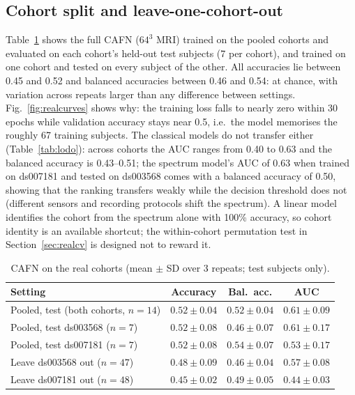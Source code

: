 \documentclass{ieeeaccessapprox}
\begin{document}
\subsection{Cohort split and leave-one-cohort-out}\label{sec:lodo}
Table~\ref{tab:cohortcafn} shows the full CAFN ($64^3$ MRI) trained on the pooled cohorts and evaluated on each cohort's held-out test subjects (7 per cohort), and trained on one cohort and tested on every subject of the other. All accuracies lie between 0.45 and 0.52 and balanced accuracies between 0.46 and 0.54: at chance, with variation across repeats larger than any difference between settings. Fig.~\ref{fig:realcurves} shows why: the training loss falls to nearly zero within 30 epochs while validation accuracy stays near 0.5, i.e.\ the model memorises the roughly 67 training subjects. The classical models do not transfer either (Table~\ref{tab:lodo}): across cohorts the AUC ranges from 0.40 to 0.63 and the balanced accuracy is 0.43--0.51; the spectrum model's AUC of 0.63 when trained on ds007181 and tested on ds003568 comes with a balanced accuracy of 0.50, showing that the ranking transfers weakly while the decision threshold does not (different sensors and recording protocols shift the spectrum). A linear model identifies the cohort from the spectrum alone with 100\% accuracy, so cohort identity is an available shortcut; the within-cohort permutation test in Section~\ref{sec:realcv} is designed not to reward it.

\begin{table}[!t]
\caption{CAFN on the real cohorts (mean $\pm$ SD over 3 repeats; test subjects only).}
\label{tab:cohortcafn}
\centering\scriptsize\setlength{\tabcolsep}{2.5pt}
\begin{tabular}{@{}lccc@{}}
\toprule
Setting & Accuracy & Bal.\ acc. & AUC\\
\midrule
Pooled, test (both cohorts, $n{=}14$) & $0.52\pm0.04$ & $0.52\pm0.04$ & $0.61\pm0.09$ \\
Pooled, test ds003568 ($n{=}7$) & $0.52\pm0.08$ & $0.46\pm0.07$ & $0.61\pm0.17$ \\
Pooled, test ds007181 ($n{=}7$) & $0.52\pm0.08$ & $0.54\pm0.07$ & $0.53\pm0.17$ \\
Leave ds003568 out ($n{=}47$) & $0.48\pm0.09$ & $0.46\pm0.04$ & $0.57\pm0.08$ \\
Leave ds007181 out ($n{=}48$) & $0.45\pm0.02$ & $0.49\pm0.05$ & $0.44\pm0.03$ \\

\bottomrule
\end{tabular}
\end{table}
\end{document}
